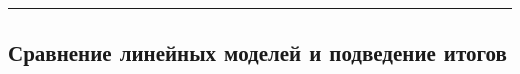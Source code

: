 \documentclass[
]{article}
\begin{document}
\begin{center}\rule{0.5\linewidth}{0.5pt}\end{center}

\hypertarget{ux441ux440ux430ux432ux43dux435ux43dux438ux435-ux43bux438ux43dux435ux439ux43dux44bux445-ux43cux43eux434ux435ux43bux435ux439-ux438-ux43fux43eux434ux432ux435ux434ux435ux43dux438ux435-ux438ux442ux43eux433ux43eux432}{%
\subsection{Сравнение линейных моделей и подведение
итогов}\label{ux441ux440ux430ux432ux43dux435ux43dux438ux435-ux43bux438ux43dux435ux439ux43dux44bux445-ux43cux43eux434ux435ux43bux435ux439-ux438-ux43fux43eux434ux432ux435ux434ux435ux43dux438ux435-ux438ux442ux43eux433ux43eux432}}
\end{document}
